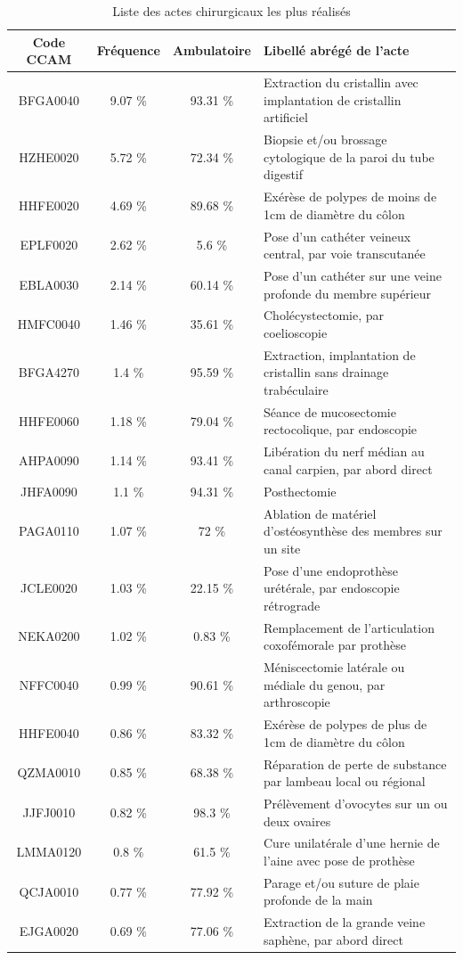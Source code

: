 \begin{table}[!b]
\centering
\caption{Liste des actes chirurgicaux les plus réalisés} 
\label{liste4}
\begin{tabular}{c|ccl}
  \hline
Code CCAM & Fréquence & Ambulatoire & Libellé abrégé de l'acte \\ 
  \hline
BFGA0040 & 9.07 \% & 93.31 \% & Extraction du cristallin avec implantation de cristallin artificiel \\ 
  HZHE0020 & 5.72 \% & 72.34 \% & Biopsie et/ou brossage cytologique de la paroi du tube digestif \\ 
  HHFE0020 & 4.69 \% & 89.68 \% & Exérèse de polypes de moins de 1cm de diamètre du côlon \\ 
  EPLF0020 & 2.62 \% & 5.6 \% & Pose d'un cathéter veineux central, par voie transcutanée \\ 
  EBLA0030 & 2.14 \% & 60.14 \% & Pose d'un cathéter sur une veine profonde du membre supérieur\\ 
  HMFC0040 & 1.46 \% & 35.61 \% & Cholécystectomie, par coelioscopie \\ 
  BFGA4270 & 1.4 \% & 95.59 \% & Extraction, implantation de cristallin sans drainage trabéculaire\\ 
  HHFE0060 & 1.18 \% & 79.04 \% & Séance de mucosectomie rectocolique, par endoscopie \\ 
  AHPA0090 & 1.14 \% & 93.41 \% & Libération du nerf médian au canal carpien, par abord direct \\ 
  JHFA0090 & 1.1 \% & 94.31 \% & Posthectomie \\ 
  PAGA0110 & 1.07 \% & 72 \% & Ablation de matériel d'ostéosynthèse des membres sur un site \\ 
  JCLE0020 & 1.03 \% & 22.15 \% & Pose d'une endoprothèse urétérale, par endoscopie rétrograde \\ 
  NEKA0200 & 1.02 \% & 0.83 \% & Remplacement de l'articulation coxofémorale par prothèse \\ 
  NFFC0040 & 0.99 \% & 90.61 \% & Méniscectomie latérale ou médiale du genou, par arthroscopie \\ 
  HHFE0040 & 0.86 \% & 83.32 \% & Exérèse de polypes de plus de 1cm de diamètre du côlon \\ 
  QZMA0010 & 0.85 \% & 68.38 \% & Réparation de perte de substance par lambeau local ou régional \\ 
  JJFJ0010 & 0.82 \% & 98.3 \% & Prélèvement d'ovocytes sur un ou deux ovaires \\ 
  LMMA0120 & 0.8 \% & 61.5 \% & Cure unilatérale d'une hernie de l'aine avec pose de prothèse \\ 
  QCJA0010 & 0.77 \% & 77.92 \% & Parage et/ou suture de plaie profonde de la main \\ 
  EJGA0020 & 0.69 \% & 77.06 \% & Extraction de la grande veine saphène, par abord direct \\ 
   \hline
\end{tabular}
\end{table}


